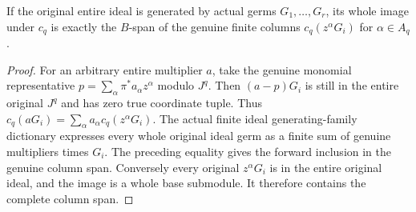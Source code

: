 \begin{lemma}
\label{hir:relative-normal-ideal-actual-columns}
\leanok
If the original entire ideal is generated by actual germs $G_1,\ldots,G_r$,
its whole image under $c_q$ is exactly the $B$-span of the genuine finite
columns $c_q(z^\alpha G_i)$ for $\alpha\in A_q$.
\end{lemma}
\begin{proof}
For an arbitrary entire multiplier $a$, take the genuine monomial
representative $p=\sum_\alpha\pi^*a_\alpha z^\alpha$ modulo $J^q$.
Then $(a-p)G_i$ is still in the entire original $J^q$ and has zero true
coordinate tuple. Thus $c_q(aG_i)=\sum_\alpha a_\alpha c_q(z^\alpha G_i)$.
The actual finite ideal generating-family dictionary expresses every whole
original ideal germ as a finite sum of genuine multipliers times $G_i$.
The preceding equality gives the forward inclusion in the genuine column
span. Conversely every original $z^\alpha G_i$ is in the entire original
ideal, and the image is a whole base submodule. It therefore contains the
complete column span.
\end{proof}

